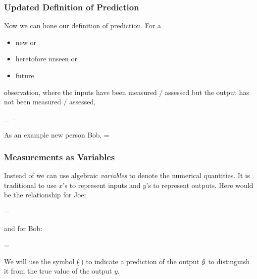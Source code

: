 \documentclass[slides]{beamer} %
\begin{document}
\begin{frame}\frametitle{Updated Definition of Prediction}

\small 
Now we can hone our definition of prediction. For a 

\begin{itemize}
\item new or
\item heretofore unseen or
\item future
\end{itemize}

observation, where the inputs have been measured / assessed but the output has not been measured / assessed, \pause 

\beqn
{}_{} = 
\eeqn
 \pause 
 
As an example new person Bob,
\tiny
\beqn
{} = 
\eeqn
\normalsize


\end{frame}


\begin{frame}\frametitle{Measurements as Variables}

Instead of  we can use algebraic \textit{variables} to denote the numerical quantities.  \pause It is traditional to use $x$'s to represent inputs and $y$'s to represent outputs.  \pause Here would be the relationship for Joe:


\beqn
{} = 
\eeqn

and for Bob: \pause 


\beqn
{} = 
\eeqn

We will use the  symbol ($\hat{~}$) to indicate a prediction of the output $\hat{y}$ to distinguish it from the true value of the output $y$.

\end{frame}
\end{document}

